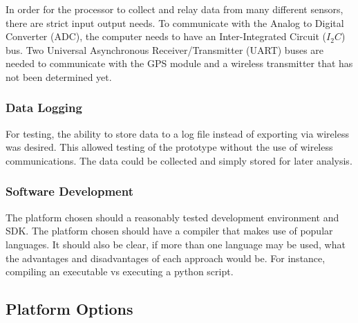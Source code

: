 In order for the processor to collect and relay data from many
different sensors, there are strict input output needs. To
communicate with the Analog to Digital Converter (ADC), the
computer needs to have an Inter-Integrated Circuit ($I_2C$) bus.
Two Universal Asynchronous Receiver/Transmitter (UART) buses are
needed to communicate with the GPS module and a wireless
transmitter that has not been determined yet.

\subsubsection{Data Logging}

For testing, the ability to store data to a log file instead of
exporting via wireless was desired. This allowed testing of the
prototype without the use of wireless communications. The data
could be collected and simply stored for later analysis. 


\subsubsection{Software Development}

The platform chosen should a reasonably tested development
environment and SDK. The platform chosen should have a compiler
that makes use of popular languages. It should also be clear, if
more than one language may be used, what the advantages and
disadvantages of each approach would be. For instance, compiling
an executable vs executing a python script. 

\subsection{Platform Options}

